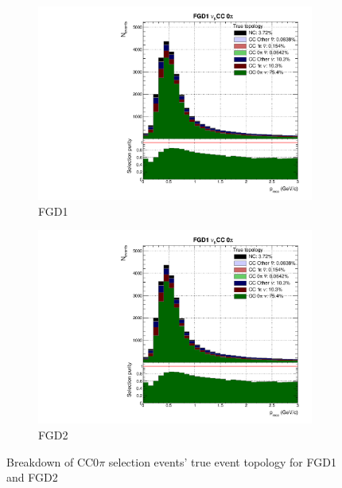 \begin{figure}[h]
	\begin{subfigure}[t]{0.49\textwidth}
		\includegraphics[width=\textwidth,page=13, trim={0mm 0mm 0mm 9mm}, clip]{figures/mach3/2018/Selection/2018_FullNoRedNDmatrix_rebin_verbose_may_diagnostics}
		\caption{FGD1}
	\end{subfigure}
	\begin{subfigure}[t]{0.49\textwidth}
		\includegraphics[width=\textwidth,page=19, trim={0mm 0mm 0mm 9mm}, clip]{figures/mach3/2018/Selection/2018_FullNoRedNDmatrix_rebin_verbose_may_diagnostics}
		\caption{FGD2}
	\end{subfigure}
	\caption{Breakdown of \numubar CC0$\pi$ selection events' true event topology for FGD1 and FGD2 }
	\label{fig:numubar_cc0pi_topology}
\end{figure}

